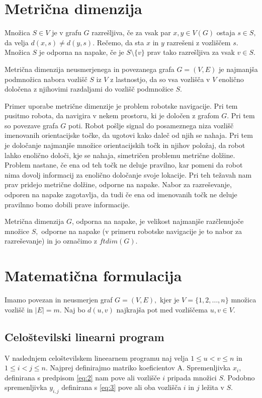 \documentclass[a4paper,10pt, fleqn]{article}
\begin{document}
\section{Metrična dimenzija}
Množica $S \in V$ je v grafu $G$ razrešljiva, če za vsak par $x, y \in V(G)$ 
ostaja $s \in S,$ da velja $d(x, s) \neq d(y, s).$ Rečemo, da sta $x$ in $y$
razrešeni z vozliščem $s$. Množica $S$ je odporna na napake, če je 
$S \setminus \{v\}$ prav tako razrešljiva za vsak $v \in S.$ 


Metrična dimenzija neusmerjenega in povezanega grafa $G = (V, E)$ je najmanjša 
podmnožica nabora vozlišč $S$ iz $V$ z lastnostjo, da so vsa vozlišča v $V$ 
enolično določena z njihovimi razdaljami do vozlišč podmnožice $S$.

Primer uporabe metrične dimenzije je problem robotske navigacije. Pri tem pusitmo
robota, da navigira v nekem prostoru, ki je določen z grafom $G$. Pri tem so 
povezave grafa $G$ poti. Robot pošlje signal do posameznega niza vozlišč imenovanih 
orientacijske točke, da ugotovi kako daleč od njih se nahaja. Pri tem je določanje 
najmanjše množice orientacijskih točk in njihov položaj, da robot lahko enolično 
določi, kje se nahaja, simetričen problemu metrične dolžine. Problem nastane, 
če ena od teh točk ne deluje pravilno, kar pomeni da robot nima dovolj informacij 
za enolično določanje svoje lokacije. Pri teh težavah nam prav pridejo metrične 
dolžine, odporne na napake. 
Nabor za razreševanje, odporen na napake zagotavlja, da tudi če ena od imenovanih 
točk ne deluje pravilnno bomo dobili prave informacije.

Metrična dimenzija $G$, odporna na napake, je velikost najmanjše razčlenujoče 
množice $S,$ odporne na napake (v primeru robotske navigacije je to nabor za 
razreševanje) in jo označimo z $ftdim(G).$


\section{Matematična formulacija}
Imamo povezan in neusmerjen graf $G = (V, E),$ kjer je $V = \{1, 2, \ldots, n\}$
množica vozlišč in $\mid E \mid = m.$ Naj bo $d(u, v)$ najkrajša pot med vozliščema
$u, v \in V.$

\subsection{Celoštevilski linearni program}
V naslednjem celoštevilskem lineearnem programu naj velja $1 \leq u < v \leq n$ in 
$1 \leq i < j \leq n.$ Najprej definirajmo matriko koeficientov A. Spremenljivka $x_i,$ 
definirana s predpisom \eqref{eq:2} nam pove ali vozlišče $i$ pripada množici $S.$ 
Podobno spremenljivka $y_{i, j}$ definirana s \eqref{eq:3} pove ali oba vozlišča $i$ 
in $j$ ležita v $S.$ 
\end{document}
